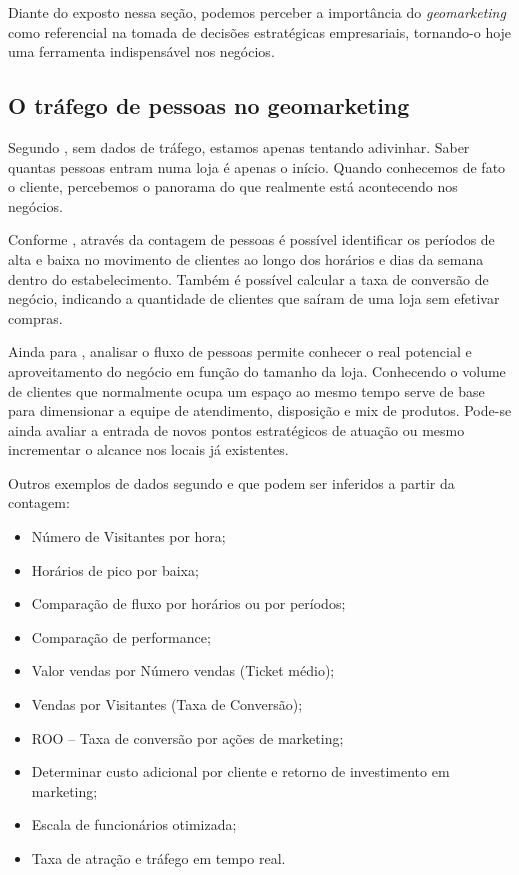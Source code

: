 Diante do exposto nessa seção, podemos perceber a importância do \emph{geomarketing} como
referencial na tomada de decisões estratégicas empresariais, tornando-o hoje uma ferramenta indispensável nos negócios.

\subsection{O tráfego de pessoas no geomarketing}

Segundo , sem dados de tráfego, estamos apenas tentando adivinhar. Saber quantas pessoas entram numa loja é apenas o início. Quando conhecemos de fato o cliente, percebemos o panorama do que realmente está acontecendo nos negócios.

Conforme , através da contagem de pessoas é possível identificar os períodos de alta e baixa no movimento de clientes ao longo dos horários e dias da semana dentro do estabelecimento. Também é possível calcular a taxa de conversão de negócio, indicando a quantidade de clientes que saíram de uma loja sem efetivar compras. 

Ainda para , analisar o fluxo de pessoas permite conhecer o real potencial e aproveitamento do negócio em função do tamanho da loja. Conhecendo o volume de clientes que normalmente ocupa um espaço ao mesmo tempo serve de base para dimensionar a equipe de atendimento, disposição e mix de produtos. Pode-se ainda avaliar a entrada de novos pontos estratégicos de atuação ou mesmo incrementar o alcance nos locais já existentes. 

Outros exemplos de dados segundo  e  que podem ser inferidos a partir da contagem:

\begin{itemize}
  \item Número de Visitantes por hora;
  \item Horários de pico por baixa;
  \item Comparação de fluxo por horários ou por períodos;
  \item Comparação de performance;
  \item Valor vendas por Número vendas (Ticket médio);
  \item Vendas por Visitantes (Taxa de Conversão);
  \item ROO – Taxa de conversão por ações de marketing;
  \item Determinar custo adicional por cliente e retorno de investimento em marketing;
  \item Escala de funcionários otimizada;
  \item Taxa de atração e tráfego em tempo real.
\end{itemize}

